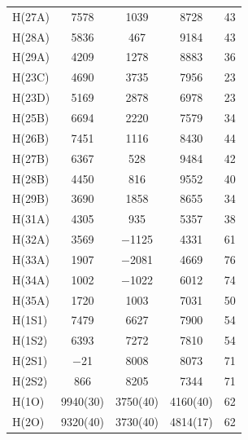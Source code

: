 \begin{center}
{\begin{supertabular}{lcccc}
H(27A)&7578&1039&8728&43\\
H(28A)&5836&467&9184&43\\
H(29A)&4209&1278&8883&36\\
H(23C)&4690&3735&7956&23\\
H(23D)&5169&2878&6978&23\\
H(25B)&6694&2220&7579&34\\
H(26B)&7451&1116&8430&44\\
H(27B)&6367&528&9484&42\\
H(28B)&4450&816&9552&40\\
H(29B)&3690&1858&8655&34\\
H(31A)&4305&935&5357&38\\
H(32A)&3569&$-$1125&4331&61\\
H(33A)&1907&$-$2081&4669&76\\
H(34A)&1002&$-$1022&6012&74\\
H(35A)&1720&1003&7031&50\\
H(1S1)&7479&6627&7900&54\\
H(1S2)&6393&7272&7810&54\\
H(2S1)&$-$21&8008&8073&71\\
H(2S2)&866&8205&7344&71\\
H(1O)&9940(30)&3750(40)&4160(40)&62\\
H(2O)&9320(40)&3730(40)&4814(17)&62\\
\end{supertabular}
}
\end{center}

